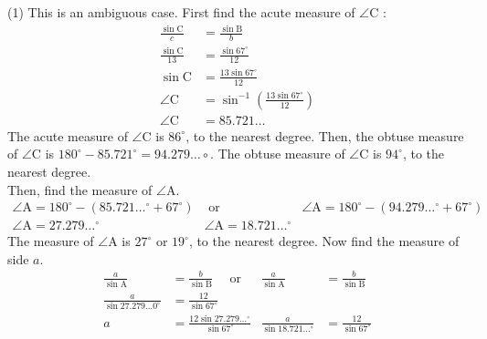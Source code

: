 \documentclass[12pt,fleqn]{book}
\newcommand{\sol}[1]{\begin{Answer}\parbox[t]{\textwidth-5em}{#1}\end{Answer}}
\begin{document}
\sol{
	\begin{tasks}(1)
		\task
		This is an ambiguous case.
		First find the acute measure of $\angle \mathrm{C}$ :
		\begin{align*}
			\frac{\sin \mathrm{C}}{c}  & =\frac{\sin \mathrm{B}}{b}                            \\
			\frac{\sin \mathrm{C}}{13} & =\frac{\sin 67^{\circ}}{12}                           \\
			\sin \mathrm{C}            & =\frac{13 \sin 67^{\circ}}{12}                        \\
			\angle \mathrm{C}          & =\sin ^{-1}\left(\frac{13 \sin 67^{\circ}}{12}\right) \\
			\angle \mathrm{C}          & =85.721 \ldots
		\end{align*}
		The acute measure of $\angle \mathrm{C}$ is $86^{\circ}$, to the nearest degree. Then, the obtuse measure of $\angle \mathrm{C}$ is $180^{\circ}-85.721^{\circ}=94.279 \ldots \circ$. The obtuse measure of $\angle \mathrm{C}$ is $94^{\circ}$, to the nearest degree.
		\\
		Then, find the measure of $\angle \mathrm{A}$.
		\[
			\begin{array}{lll}
				\angle \mathrm{A}=180^{\circ}-\left(85.721 \ldots{ }^{\circ}+67^{\circ}\right) & \text { or }                               & \angle \mathrm{A}=180^{\circ}-\left(94.279 \ldots{ }^{\circ}+67^{\circ}\right) \\
				\angle \mathrm{A}=27.279 \ldots{ }^{\circ}                                     & \angle \mathrm{A}=18.721 \ldots{ }^{\circ}
			\end{array}
		\]
		The measure of $\angle \mathrm{A}$ is $27^{\circ}$ or $19^{\circ}$, to the nearest degree.
		Now find the measure of side $a$.
		\[
			\begin{array}{rlrl}
				\frac{a}{\sin \mathrm{A}}              & =\frac{b}{\sin \mathrm{B}} \quad \text { or }             & \frac{a}{\sin \mathrm{A}}               & =\frac{b}{\sin \mathrm{B}}                                \\
				\frac{a}{\sin 27.279 \ldots 0^{\circ}} & =\frac{12}{\sin 67^{\circ}}                                                                                                                                     \\
				a                                      & =\frac{12 \sin 27.279 \ldots{ }^{\circ}}{\sin 67^{\circ}} & \frac{a}{\sin 18.721 \ldots{ }^{\circ}} & =\frac{12}{\sin 67^{\circ}}                               \\

\end{array}\]
\end{tasks}}
\end{document}
